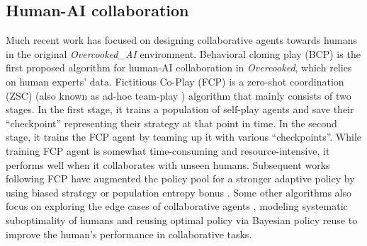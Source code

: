 \subsection{Human-AI collaboration}
Much recent work has focused on designing collaborative agents towards humans in the original \textit{Overcooked\_AI} environment. Behavioral cloning play (BCP) \cite{carroll2019utility} is the first proposed algorithm for human-AI collaboration in \textit{Overcooked}, which relies on human experts' data. Fictitious Co-Play (FCP) \cite{strouse2021collaborating} is a zero-shot coordination (ZSC) (also known as ad-hoc team-play \cite{stone2010ad}) algorithm that mainly consists of two stages. In the first stage, it trains a population of self-play agents and save their ``checkpoint'' representing their strategy at that point in time. In the second stage, it trains the FCP agent by teaming up it with various ``checkpoints''. While training FCP agent is somewhat time-consuming and resource-intensive, it performs well when it collaborates with unseen humans. Subsequent works following FCP have augmented the policy pool for a stronger adaptive policy by using biased strategy \cite{yu2023learning} or population entropy bonus \cite{zhao2023maximum}. Some other algorithms also focus on exploring the edge cases of collaborative agents \cite{knott2021evaluating}, modeling systematic suboptimality of humans \cite{laidlaw2022boltzmann} and reusing optimal policy via Bayesian policy reuse \cite{wangbeyond} to improve the human's performance in collaborative tasks. 
